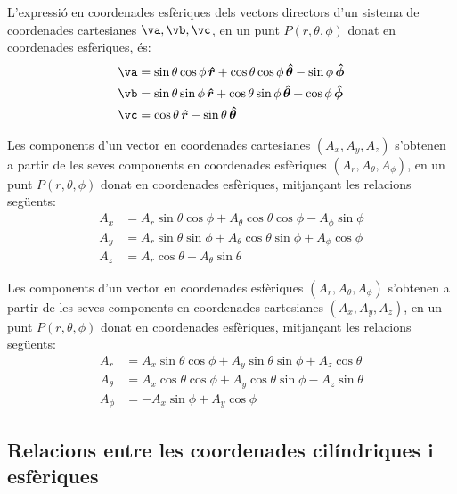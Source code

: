 \documentclass[catalan,a4paper,twoside,11pt]{article}
\begin{document}
L'expressió en coordenades esfèriques dels vectors directors d'un sistema de coordenades  cartesianes $\va,\vb,\vc$, en un punt $P(r,\theta,\phi)$ donat en coordenades esfèriques, és:
\begin{subequations}\begin{align}
    \va &=\sin\theta\cos\phi\,\boldsymbol{\hat{r}}+
    \cos\theta\cos\phi\,\boldsymbol{\hat{\theta}}-\sin\phi\,\boldsymbol{\hat{\phi}}\\
    \vb &=\sin\theta\sin\phi\,\boldsymbol{\hat{r}}+
    \cos\theta\sin\phi\,\boldsymbol{\hat{\theta}}+\cos\phi\,\boldsymbol{\hat{\phi}}\\
    \vc &=\cos\theta\,\boldsymbol{\hat{r}}-\sin\theta\,\boldsymbol{\hat{\theta}}
\end{align}\end{subequations}

Les components d'un vector en coordenades cartesianes $(A_x, A_y, A_z)$ s'obtenen a partir de les seves components en coordenades esfèriques $(A_r, A_\theta, A_\phi)$, en un punt $P(r,\theta,\phi)$ donat en coordenades esfèriques, mitjançant les relacions següents:
\begin{subequations}\begin{align}
    A_x &= A_r\sin\theta\cos\phi+A_\theta\cos\theta\cos\phi-A_\phi\sin\phi \\
    A_y &= A_r\sin\theta\sin\phi+A_\theta\cos\theta\sin\phi+A_\phi\cos\phi\\
    A_z &= A_r\cos\theta-A_\theta\sin\theta
\end{align}\end{subequations}

Les components d'un vector en coordenades esfèriques $(A_r, A_\theta, A_\phi)$ s'obtenen a partir de les seves components en coordenades cartesianes $(A_x, A_y, A_z)$, en un punt $P(r,\theta,\phi)$ donat en coordenades esfèriques, mitjançant les relacions següents:
\begin{subequations}\begin{align}
    A_r &=  A_x\sin\theta\cos\phi+A_y\sin\theta\sin\phi+A_z\cos\theta\\
    A_\theta &=  A_x\cos\theta\cos\phi+A_y\cos\theta\sin\phi-A_z\sin\theta\\
    A_\phi &= -A_x\sin\phi+A_y\cos\phi
\end{align}\end{subequations}


\subsection{Relacions entre les coordenades cilíndriques i
esfèriques}
\end{document}
